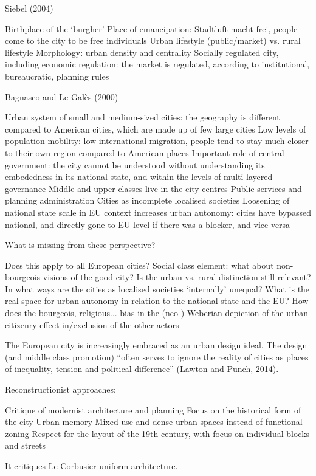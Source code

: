 \documentclass{article}
\begin{document}
Siebel (2004)
\begin{outline}
	\1 Birthplace of the `burgher'
	\1 Place of emancipation: Stadtluft macht frei, people come to the city to be free individuals
	\1 Urban lifestyle (public/market) vs. rural lifestyle
	\1 Morphology: urban density and centrality
	\1 Socially regulated city, including economic regulation: the market is regulated, according to institutional, bureaucratic, planning rules
\end{outline}

Bagnasco and Le Galès (2000)
\begin{outline}
	\1 Urban system of small and medium-sized cities: the geography is different compared to American cities, which are made up of few large cities
	\1 Low levels of population mobility: low international migration, people tend to stay much closer to their own region compared to American places
	\1 Important role of central government: the city cannot be understood without understanding its embededness in its national state, and within the levels of multi-layered governance
	\1 Middle and upper classes live in the city centres
	\1 Public services and planning administration
	\1 Cities as incomplete localised societies
	\1 Loosening of national state scale in EU context increases urban autonomy: cities have bypassed national, and directly gone to EU level if there was a blocker, and vice-versa
\end{outline}

What is missing from these perspective?

\begin{outline}
	\1 Does this apply to all European cities?
	\1 Social class element: what about non-bourgeois visions of the good city? 
	\1 Is the urban vs. rural distinction still relevant?
	\1 In what ways are the cities as localised societies `internally' unequal?
	\1 What is the real space for urban autonomy in relation to the national state and the EU?
	\1 How does the bourgeois, religious... bias in the (neo-) Weberian depiction of the urban citizenry effect in/exclusion of the other actors
\end{outline}

The European city is increasingly embraced as an urban design ideal. The design (and middle class promotion) ``often serves to ignore the reality of cities as places of inequality, tension and political difference'' (Lawton and Punch, 2014). 

Reconstructionist approaches:
\begin{outline}
	\1 Critique of modernist architecture and planning
	\1 Focus on the historical form of the city
	\1 Urban memory
	\1 Mixed use and dense urban spaces instead of functional zoning
	\1 Respect for the layout of the 19th century, with focus on individual blocks and streets
\end{outline}
It critiques Le Corbusier uniform architecture. 
\end{document}

